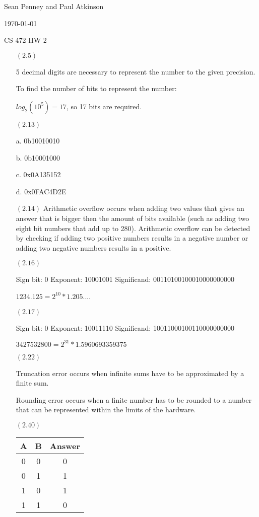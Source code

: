 \documentclass[letterpaper,10pt,titlepage]{article}
\def\name{Sean Penney and Paul Atkinson}
\begin{document}
\hfill \name

\hfill \today

\hfill CS 472 HW 2

\begin{enumerate}
\item[$(2.5)$] 

  5 decimal digits are necessary to represent the number to the given precision.
  
  To find the number of bits to represent the number:
  
  $log_{2}(10^5) = 17$, so 17 bits are required.

\item[$(2.13)$]  

  a.  0b10010010
  
  b.  0b10001000
  
  c.  0x0A135152
  
  d.  0x0FAC4D2E
  
 \item[$(2.14)$]
  Arithmetic overflow occurs when adding two values that gives an answer that is bigger then the amount of bits available
  (such as adding two eight bit numbers that add up to 280). Arithmetic overflow can be detected by checking if adding two positive numbers
  results in a negative number or adding two negative numbers results in a positive.
  
\item[$(2.16)$]

  Sign bit: 0
  Exponent: 10001001
  Significand: 00110100100010000000000
  
  $1234.125 = 2^{10} * 1.205$....
  
\item[$(2.17)$]

  Sign bit: 0
  Exponent: 10011110
  Significand: 10011000100110000000000
  
  $3427532800 = 2^{31} * 1.5960693359375$
  
\item[$(2.22)$]

  Truncation error occurs when infinite sums have to be approximated by a finite sum.
  
  Rounding error occurs when a finite number has to be rounded to a number that can be represented within the limits of the hardware.
  
\item[$(2.40)$]

\begin{tabular}{c|c|c}
A & B & Answer \\
\hline
0 & 0 & 0 \\
0 & 1 & 1 \\
1 & 0 & 1 \\
1 & 1 & 0 \\
\end{tabular}


\end{enumerate}
\end{document}
